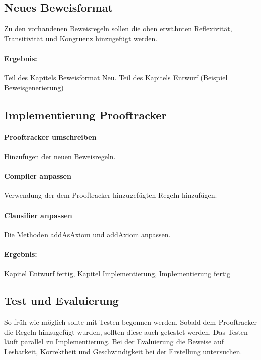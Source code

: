 \documentclass[a4paper]{article}
\begin{document}
\subsection{Neues Beweisformat}

Zu den vorhandenen Beweisregeln sollen die oben erwähnten Reflexivität, Transitivität und Kongruenz hinzugefügt werden.

\paragraph{Ergebnis:}
Teil des Kapitels Beweisformat Neu.
Teil des Kapitels Entwurf (Beispiel Beweisgenerierung)


\subsection{Implementierung Prooftracker}

\paragraph{Prooftracker umschreiben}

Hinzufügen der neuen Beweisregeln.

\paragraph{Compiler anpassen}

Verwendung der dem Prooftracker hinzugefügten Regeln hinzufügen.

\paragraph{Clausifier anpassen}

Die Methoden addAsAxiom und addAxiom anpassen.

\paragraph{Ergebnis:}
Kapitel Entwurf fertig, Kapitel Implementierung, Implementierung fertig

\subsection{Test und Evaluierung}

So früh wie möglich sollte mit Testen begonnen werden.
Sobald dem Prooftracker die Regeln hinzugefügt wurden, sollten diese auch getestet werden.
Das Testen läuft parallel zu Implementierung.
Bei der Evaluierung die Beweise auf Lesbarkeit, Korrektheit und Geschwindigkeit bei der Erstellung untersuchen.
\end{document}
